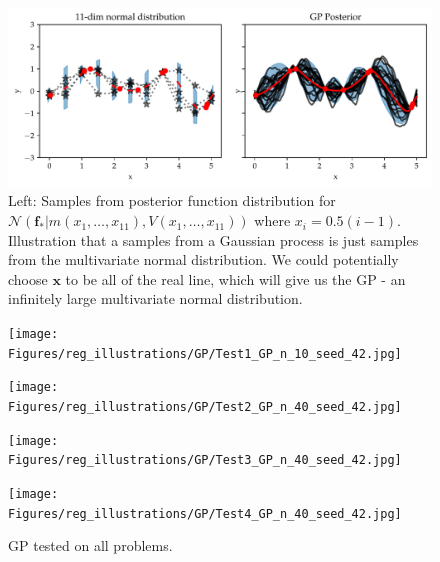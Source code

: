\begin{figure}[h]
    \centering
    \includegraphics[width = \textwidth]{Pictures/GP2_samples_mattern.pdf}
    \caption{Left: Samples from posterior function distribution for
    $\mathcal{N}(\textbf{f}_*|m(x_1,\dots, x_{11}),V(x_1,\dots, x_{11}))$ where $x_i= 0.5(i-1)$.
    Illustration that a samples from a Gaussian process is just samples from the multivariate normal
    distribution. We could potentially choose $\textbf{x}$ to be all of the real line, which will
    give us the GP - an infinitely large multivariate normal distribution.}
    \label{GP_illustration2}
\end{figure}


\begin{figure}[h]
    \centering
    \begin{minipage}[b]{0.49\textwidth}
     \texttt{[image: Figures/reg\_illustrations/GP/Test1\_GP\_n\_10\_seed\_42.jpg]}
    \end{minipage}
    \hfill
    \begin{minipage}[b]{0.49\textwidth}
      \texttt{[image: Figures/reg\_illustrations/GP/Test2\_GP\_n\_40\_seed\_42.jpg]}
     \end{minipage}
    
     \begin{minipage}[b]{0.49\textwidth}
      \texttt{[image: Figures/reg\_illustrations/GP/Test3\_GP\_n\_40\_seed\_42.jpg]}
     \end{minipage}
     \hfill
     \begin{minipage}[b]{0.49\textwidth}
       \texttt{[image: Figures/reg\_illustrations/GP/Test4\_GP\_n\_40\_seed\_42.jpg]}
      \end{minipage}
      \caption{GP tested on all problems.}
\end{figure}


